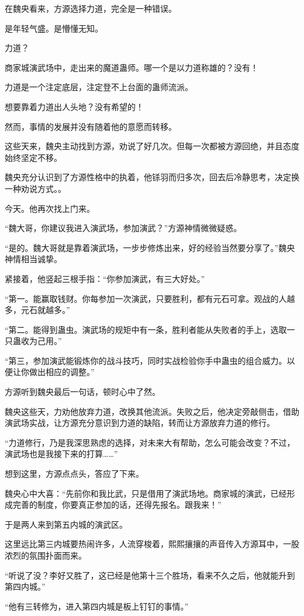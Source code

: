 \begin{this_body}
在魏央看来，方源选择力道，完全是一种错误。

是年轻气盛。是懵懂无知。

力道？

商家城演武场中，走出来的魔道蛊师。哪一个是以力道称雄的？没有！

力道是一个注定底层，注定登不上台面的蛊师流派。

想要靠着力道出人头地？没有希望的！

然而，事情的发展并没有随着他的意愿而转移。

这些天来，魏央主动找到方源，劝说了好几次。但每一次都被方源回绝，并且态度始终坚定不移。

魏央充分认识到了方源性格中的执着，他铩羽而归多次，回去后冷静思考，决定换一种劝说方式。。

今天。他再次找上门来。

“魏大哥，你建议我进入演武场，参加演武？”方源神情微微疑惑。

“是的。魏大哥就是靠着演武场，一步步修炼出来，好的经验当然要分享了。”魏央神情相当诚挚。

紧接着，他竖起三根手指：“你参加演武，有三大好处。”

“第一。能赢取钱财。你每参加一次演武，只要胜利，都有元石可拿。观战的人越多，元石就越多。”

“第二。能得到蛊虫。演武场的规矩中有一条，胜利者能从失败者的手上，选取一只蛊收为己用。”

“第三，参加演武能锻炼你的战斗技巧，同时实战检验你手中蛊虫的组合威力。以便让你做出相应的调整。”

方源听到魏央最后一句话，顿时心中了然。

魏央这些天，力劝他放弃力道，改换其他流派。失败之后，他决定旁敲侧击，借助演武场实战，让方源充分意识到力道的缺陷，转而让方源放弃力道的修行。

“力道修行，乃是我深思熟虑的选择，对未来大有帮助，怎么可能会改变？不过，演武场也是我接下来的打算……”

想到这里，方源点点头，答应了下来。

魏央心中大喜：“先前你和我比武，只是借用了演武场地。商家城的演武，已经形成完善的制度，你要真正参加的话，还得先报名。跟我来！”

于是两人来到第五内城的演武区。

这里远比第三内城要热闹许多，人流穿梭着，熙熙攘攘的声音传入方源耳中，一股浓烈的氛围扑面而来。

“听说了没？李好又胜了，这已经是他第十三个胜场，看来不久之后，他就能升到第四内城。”

“他有三转修为，进入第四内城是板上钉钉的事情。”


\end{this_body}
